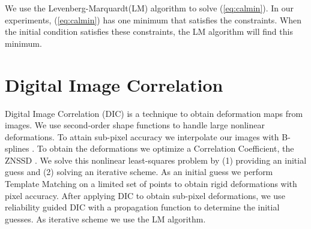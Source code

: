 \documentclass{svjour3}                     %
\begin{document}
We use the Levenberg-Marquardt(LM) algorithm to solve (\ref{eq:calmin}). In our experiments, (\ref{eq:calmin}) has one minimum that satisfies the constraints. When the initial condition satisfies these constraints, the LM algorithm will find this minimum.


\section{Digital Image Correlation}
\label{sec:DIC}
Digital Image Correlation (DIC) is a technique \cite{sutton2009image} to obtain deformation maps from images. We use second-order shape functions \cite{lu2000deformation} to handle large nonlinear deformations. To attain sub-pixel accuracy we interpolate our images with B-splines \cite{thevenaz2000interpolation, unser1999splines}. To obtain the deformations we optimize a Correlation Coefficient, the ZNSSD \cite{sutton2009image}. We solve this nonlinear least-squares problem  by (1) providing an initial guess and (2) solving an iterative scheme. As an initial guess we perform Template Matching \cite{lewis1995industrial,opencv_library} on a limited set of points to obtain rigid deformations with pixel accuracy. After applying DIC to obtain sub-pixel deformations, we use reliability guided DIC \cite{pan2012incremental} with a propagation function \cite{zhou2012propagation} to determine the initial guesses. As iterative scheme we use the LM algorithm. 
\end{document}
